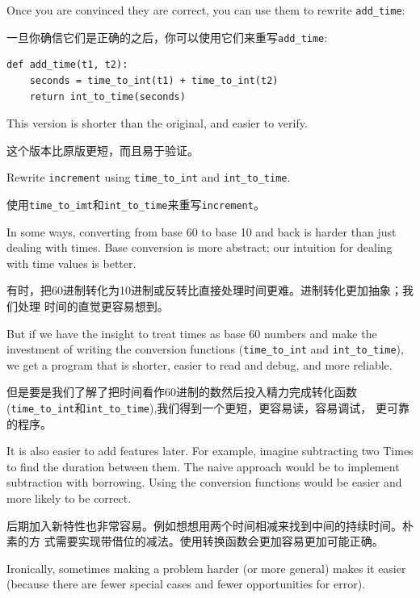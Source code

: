 \documentclass[10pt]{book}
\begin{document}
\begin{CJK}{UTF8}{gbsn}
Once you are convinced they are correct, you can use them to 
rewrite \verb"add_time":

一旦你确信它们是正确的之后，你可以使用它们来重写\verb"add_time":

\begin{verbatim}
def add_time(t1, t2):
    seconds = time_to_int(t1) + time_to_int(t2)
    return int_to_time(seconds)
\end{verbatim}
%
This version is shorter than the original, and easier to verify.

这个版本比原版更短，而且易于验证。

\begin{exercise}

Rewrite {\tt increment} using \verb"time_to_int" and \verb"int_to_time".

使用\verb"time_to_imt"和\verb"int_to_time"来重写{\tt increment}。

\end{exercise}

In some ways, converting from base 60 to base 10 and back is harder
than just dealing with times.  Base conversion is more abstract; our
intuition for dealing with time values is better.

有时，把60进制转化为10进制或反转比直接处理时间更难。进制转化更加抽象；我们处理
时间的直觉更容易想到。

But if we have the insight to treat times as base 60 numbers and make
the investment of writing the conversion functions (\verb"time_to_int"
and \verb"int_to_time"), we get a program that is shorter, easier to
read and debug, and more reliable.

但是要是我们了解了把时间看作60进制的数然后投入精力完成转化函数
(\verb"time_to_int"和\verb"int_to_time"),我们得到一个更短，更容易读，容易调试，
更可靠的程序。

It is also easier to add features later.  For example, imagine
subtracting two Times to find the duration between them.  The
naive approach would be to implement subtraction with borrowing.
Using the conversion functions would be easier and more likely to be
correct.

后期加入新特性也非常容易。例如想想用两个时间相减来找到中间的持续时间。朴素的方
式需要实现带借位的减法。使用转换函数会更加容易更加可能正确。

Ironically, sometimes making a problem harder (or more general) makes it
easier (because there are fewer special cases and fewer opportunities
for error).


\end{CJK}
\end{document}
